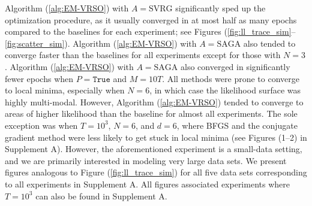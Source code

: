 Algorithm (\ref{alg:EM-VRSO}) with $A=\text{SVRG}$ significantly sped up the optimization procedure, as it usually converged in at most half as many epochs compared to the baselines for each experiment; see Figures (\ref{fig:ll_trace_sim}--\ref{fig:scatter_sim}). Algorithm (\ref{alg:EM-VRSO}) with $A=\text{SAGA}$ also tended to converge faster than the baselines for all experiments except for those with $N=3$. Algorithm (\ref{alg:EM-VRSO}) with $A=\text{SAGA}$ also converged in significantly fewer epochs when $P = \texttt{True}$ and $M=10T$. 
%
All methods were prone to converge to local minima, especially when $N=6$, in which case the likelihood surface was highly multi-modal. However, Algorithm (\ref{alg:EM-VRSO}) tended to converge to areas of higher likelihood than the baseline for almost all experiments. The sole exception was when $T=10^3$, $N=6$, and $d=6$, where BFGS and the conjugate gradient method were less likely to get stuck in local minima (see Figures (1--2) in Supplement A). However, the aforementioned experiment is a small-data setting, and we are primarily interested in modeling very large data sets. %
%
%
We present figures analogous to Figure (\ref{fig:ll_trace_sim}) for all five data sets corresponding to all experiments in Supplement A. All figures associated experiments where $T=10^3$ can also be found in Supplement A. 

%



